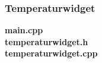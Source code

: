 \subsubsection{Temperaturwidget}
\textbf{main.cpp}
\\

\textbf{temperaturwidget.h}
\\

\newpage
\textbf{temperaturwidget.cpp}
